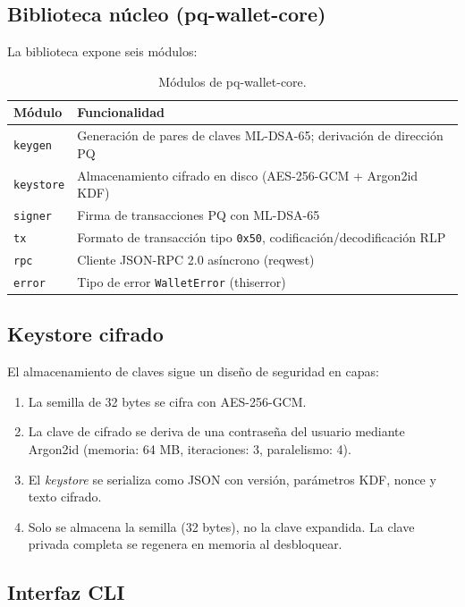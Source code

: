 \subsection{Biblioteca núcleo (pq-wallet-core)}

La biblioteca expone seis módulos:

\begin{table}[htbp]
\centering
\caption{Módulos de pq-wallet-core.}
\label{tab:wallet_core}
\begin{tabular}{@{}lL{8cm}@{}}
\toprule
\textbf{Módulo} & \textbf{Funcionalidad} \\
\midrule
\texttt{keygen} & Generación de pares de claves ML-DSA-65; derivación de dirección PQ \\
\texttt{keystore} & Almacenamiento cifrado en disco (AES-256-GCM + Argon2id KDF) \\
\texttt{signer} & Firma de transacciones PQ con ML-DSA-65 \\
\texttt{tx} & Formato de transacción tipo \texttt{0x50}, codificación/decodificación RLP \\
\texttt{rpc} & Cliente JSON-RPC 2.0 asíncrono (reqwest) \\
\texttt{error} & Tipo de error \texttt{WalletError} (thiserror) \\
\bottomrule
\end{tabular}
\end{table}

\subsection{Keystore cifrado}

El almacenamiento de claves sigue un diseño de seguridad en capas:

\begin{enumerate}
  \item La semilla de 32 bytes se cifra con AES-256-GCM.
  \item La clave de cifrado se deriva de una contraseña del usuario mediante Argon2id (memoria: 64 MB, iteraciones: 3, paralelismo: 4).
  \item El \emph{keystore} se serializa como JSON con versión, parámetros KDF, nonce y texto cifrado.
  \item Solo se almacena la semilla (32 bytes), no la clave expandida. La clave privada completa se regenera en memoria al desbloquear.
\end{enumerate}

\subsection{Interfaz CLI}

